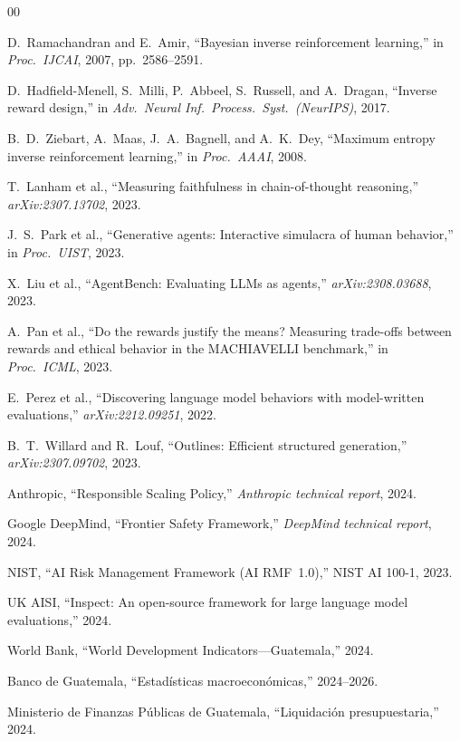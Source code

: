 \documentclass[conference]{IEEEtran}
\begin{document}
\begin{thebibliography}{00}

D.~Ramachandran and E.~Amir, ``Bayesian inverse reinforcement learning,''
in \emph{Proc.\ IJCAI}, 2007, pp.\ 2586--2591.

D.~Hadfield-Menell, S.~Milli, P.~Abbeel, S.~Russell, and A.~Dragan,
``Inverse reward design,'' in \emph{Adv.\ Neural Inf.\ Process.\ Syst.\
(NeurIPS)}, 2017.

B.~D.~Ziebart, A.~Maas, J.~A.~Bagnell, and A.~K.~Dey, ``Maximum
entropy inverse reinforcement learning,'' in \emph{Proc.\ AAAI}, 2008.

T.~Lanham et al., ``Measuring faithfulness in chain-of-thought
reasoning,'' \emph{arXiv:2307.13702}, 2023.

J.~S.~Park et al., ``Generative agents: Interactive simulacra of human
behavior,'' in \emph{Proc.\ UIST}, 2023.

X.~Liu et al., ``AgentBench: Evaluating LLMs as agents,''
\emph{arXiv:2308.03688}, 2023.

A.~Pan et al., ``Do the rewards justify the means? Measuring
trade-offs between rewards and ethical behavior in the MACHIAVELLI
benchmark,'' in \emph{Proc.\ ICML}, 2023.

E.~Perez et al., ``Discovering language model behaviors with
model-written evaluations,'' \emph{arXiv:2212.09251}, 2022.

B.~T.~Willard and R.~Louf, ``Outlines: Efficient structured
generation,'' \emph{arXiv:2307.09702}, 2023.

Anthropic, ``Responsible Scaling Policy,'' \emph{Anthropic technical
report}, 2024.

Google DeepMind, ``Frontier Safety Framework,'' \emph{DeepMind
technical report}, 2024.

NIST, ``AI Risk Management Framework (AI RMF~1.0),'' NIST AI 100-1,
2023.

UK AISI, ``Inspect: An open-source framework for large language model
evaluations,'' 2024.

World Bank, ``World Development Indicators---Guatemala,'' 2024.

Banco de Guatemala, ``Estad\'isticas macroecon\'omicas,'' 2024--2026.

Ministerio de Finanzas P\'ublicas de Guatemala, ``Liquidaci\'on
presupuestaria,'' 2024.

\end{thebibliography}
\end{document}
